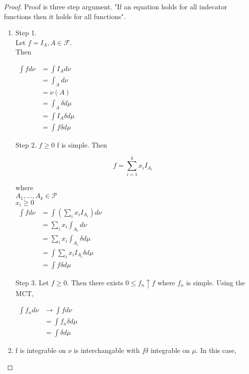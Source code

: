 \documentclass[11pt,fleqn]{book} %
\begin{document}
\begin{proof}
	Proof is three step argument. "If an equation holds for all indecator functions then it holds for all functions". \\

	\begin{enumerate}
		\item  Step 1. \\

		Let $f = I_A, A \in \mathcal{F}$. \\

		Then 

				$\begin{aligned}
					\int f d\nu &= \int I_A d\nu\\
						&= \int_A d\nu\\
						&= \nu(A) \\
						&=\int_A \delta d\mu\\
						&= \int I_A \delta d\mu\\
						&= \int f \delta d\mu
				\end{aligned}$

		Step 2. $f \geq 0$ f is simple. Then 

				$$f = \sum_{i=1}^k x_i I_{A_i} $$

		where \\
		$A_1, \dots, A_k \in \mathcal{P}$\\
		$x_i \geq 0$\\

				$\begin{aligned}
					\int f d\nu &= \int (\sum_i x_i I_{A_i}) d\nu\\
						&=\sum_i x_i \int_{A_i}d\nu\\
						&=\sum_i x_i \int_{A_i} \delta d\mu\\
						&= \int \sum_i x_i I_{A_i} \delta d\mu\\
						&= \int f \delta d\mu
				\end{aligned}$

		 Step 3. Let $ f \geq 0$. Then there exists $0 \leq f_n \uparrow f$ where $f_n$ is simple. Using the MCT, 

				$\begin{aligned}
					\int f_n d\nu &\rightarrow \int f d\nu\\
						&=\int f_n \delta d\mu\\
						&= \int \delta d\mu
				\end{aligned}$	

		\item f is integrable on $\nu$ is interchangable with $f \delta$ integrable on $\mu$. In this case, 
		

\end{enumerate}
\end{proof}
\end{document}
